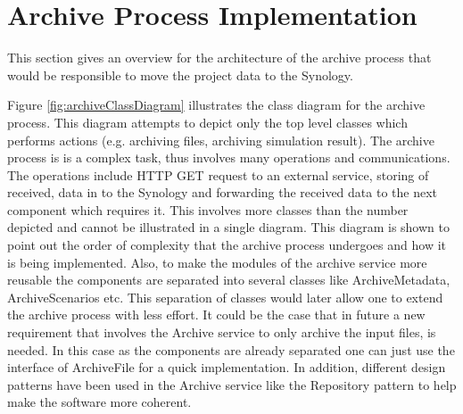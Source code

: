 \section{Archive Process Implementation}
This section gives an overview for the architecture of the archive process that would be responsible
to move the project data to the Synology. 

Figure \ref{fig:archiveClassDiagram} illustrates the class diagram for the archive process. This diagram attempts to depict only the top level classes
which performs actions (e.g. archiving files, archiving simulation result). The archive process is is a complex 
task, thus involves many operations and communications. The operations include HTTP GET request to an external service, storing of received,
data in to the Synology and forwarding the received data to the next component which requires it. This involves more classes than the number depicted
and cannot be illustrated in a single diagram. This diagram is shown to point out the order of complexity that the archive process undergoes and how it is being
implemented. Also, to make the modules of the archive service more reusable the components are separated into several classes
like ArchiveMetadata, ArchiveScenarios etc. This separation
of classes would later allow one to extend the archive process with less effort. It could be the case that in future a new requirement
that involves the Archive service to only archive
the input files, is needed. In this case as the components are already separated one can just use the interface of ArchiveFile for a quick implementation. 
In addition, different design patterns have been used
in the Archive service like the Repository pattern \cite{repo} to help make the software more coherent.
 
